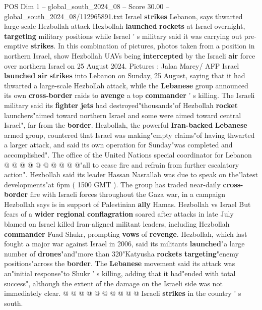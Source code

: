 \begin{textsample}{POS Dim 1 – global\_south\_2024\_08 – Score 30.00 – global\_south\_2024\_08/112965891.txt}  \label{ex:f1_pos_010}
Israel \textbf{strikes} Lebanon, says thwarted large-scale Hezbollah attack Hezbollah \textbf{launched} \textbf{rockets} at Israel overnight, \textbf{targeting} military positions while Israel ' s military said it was carrying out pre-emptive \textbf{strikes}.
In this combination of pictures, photos taken from a position in northern Israel, show Hezbollah UAVs being \textbf{intercepted} by the Israeli \textbf{air} force over northern Israel on 25 August 2024.
Pictures : Jalaa Marey/ AFP Israel \textbf{launched} \textbf{air} \textbf{strikes} into Lebanon on Sunday, 25 August, saying that it had thwarted a large-scale Hezbollah attack, while the \textbf{Lebanese} group announced its own \textbf{cross-border} raids to \textbf{avenge} a top \textbf{commander} ' s killing.
The Israeli military said its \textbf{fighter} \textbf{jets} had destroyed"thousands"of Hezbollah \textbf{rocket} launchers"aimed toward northern Israel and some were aimed toward central Israel", far from the \textbf{border}.
Hezbollah, the powerful \textbf{Iran-backed} \textbf{Lebanese} armed group, countered that Israel was making"empty claims"of having thwarted a larger attack, and said its own operation for Sunday"was completed and accomplished".
The office of the United Nations special coordinator for Lebanon @ @ @ @ @ @ @ @ @ @"all to cease fire and refrain from further escalatory action".
Hezbollah said its leader Hassan Nasrallah was due to speak on the"latest developments"at 6pm ( 1500 GMT ).
The group has traded near-daily \textbf{cross-border} fire with Israeli forces throughout the Gaza war, in a campaign Hezbollah says is in support of Palestinian \textbf{ally} Hamas.
Hezbollah vs Israel But fears of a \textbf{wider} \textbf{regional} \textbf{conflagration} soared after attacks in late July blamed on Israel killed Iran-aligned militant leaders, including Hezbollah \textbf{commander} Fuad Shukr, prompting \textbf{vows} of \textbf{revenge}.
Hezbollah, which last fought a major war against Israel in 2006, said its militants \textbf{launched}"a large number of \textbf{drones}"and"more than 320"Katyusha \textbf{rockets} \textbf{targeting}"enemy positions"across the \textbf{border}.
The \textbf{Lebanese} movement said its attack was an"initial response"to Shukr ' s killing, adding that it had"ended with total success", although the extent of the damage on the Israeli side was not immediately clear. @ @ @ @ @ @ @ @ @ @ Israeli \textbf{strikes} in the country ' s south.

\end{textsample}
